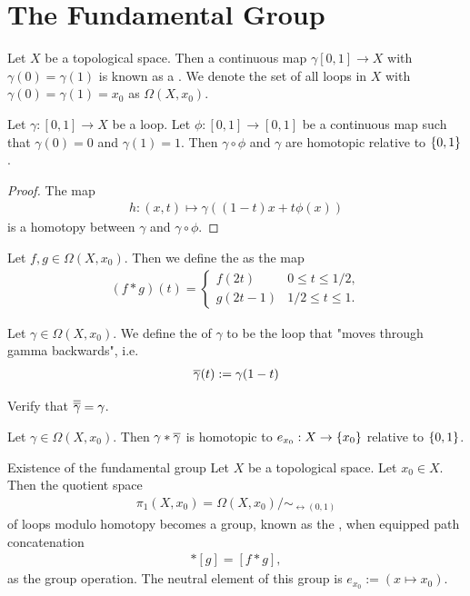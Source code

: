 \section{The Fundamental Group}
\begin{definition}
	Let $X$ be a topological space. Then a continuous map $\gamma [0,1] \to X$ with $\gamma(0) = \gamma(1)$ is known as a . We denote the set of all loops in $X$ with $\gamma(0) = \gamma(1) = x_0$ as $\Omega(X, x_0)$.
\end{definition}
\begin{lemma}
	Let $\gamma : [0,1] \to X$ be a loop. Let $\phi : [0,1] \to [0,1]$ be a continuous map such that $\gamma(0) = 0$ and $\gamma(1) = 1$. Then $\gamma \circ \phi$ and $\gamma$ are homotopic relative to $\qty{0,1}$.
\end{lemma}
\begin{proof}
	The map
	\begin{align*}
		h : (x,t) \mapsto \gamma((1-t)x + t \phi(x))
	\end{align*}
	is a homotopy between $\gamma$ and $\gamma \circ \phi$.
\end{proof}
\begin{definition}
	Let $f, g \in \Omega(X, x_0)$. Then we define the  as the map
	\begin{align*}
		(f * g)(t) =
		\begin{cases}
			f(2t) & 0 \leq t \leq 1/2,\\
			g(2t - 1) & 1/2 \leq t \leq 1.
		\end{cases}
	\end{align*}
\end{definition}
\begin{definition}
	Let $\gamma \in \Omega(X, x_0)$. We define the  of $\gamma$ to be the loop that "moves through gamma backwards", i.e.
	\begin{align*}
		\overline{{\gamma}}(t) := \gamma(1-t)
	\end{align*}
\end{definition} 
\begin{exercise}
	Verify that $\overline{{\overline{{\gamma}}}} = \gamma$.
\end{exercise}
\begin{exercise}
	Let $\gamma \in \Omega(X, x_0)$. Then $\gamma * \overline{{\gamma}}$ is homotopic to $e_{x_0} : X \to \qty{x_0}$ relative to $\qty{0,1}$.
\end{exercise}
\begin{importanttheorem}{Existence of the fundamental group}{}
	Let $X$ be a topological space. Let $x_0 \in X$. Then the quotient space
	\begin{align*}
		\pi_1(X, x_0) = \Omega(X, x_0) / \sim_{\rel({0,1})}
	\end{align*}
	of loops modulo homotopy
	becomes a group, known as the , when equipped path concatenation
	\begin{align*}
		[f] * [g] = [f * g],
	\end{align*}
	as the group operation.
	The neutral element of this group is $e_{x_0} := (x \mapsto x_0)$.
\end{importanttheorem}
